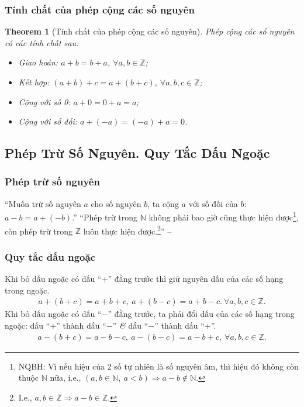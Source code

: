 \documentclass{article}
\numberwithin{equation}{section}
\newtheorem{theorem}{Theorem}[section]
\begin{document}
\subsubsection{Tính chất của phép cộng các số nguyên}

\begin{theorem}[Tính chất của phép cộng các số nguyên]
	Phép cộng các số nguyên có các tính chất sau:
	\begin{itemize}
		\item Giao hoán: $a + b = b + a$, $\forall a,b\in\mathbb{Z}$;
		\item Kết hợp: $(a + b) + c = a + (b + c)$, $\forall a,b,c\in\mathbb{Z}$;
		\item Cộng với số 0: $a + 0 = 0 + a = a$;
		\item Cộng với số đối: $a + (-a) = (-a) + a = 0$.
	\end{itemize}
\end{theorem}

\subsection{Phép Trừ Số Nguyên. Quy Tắc Dấu Ngoặc}

\subsubsection{Phép trừ số nguyên}
``Muốn trừ số nguyên $a$ cho số nguyên $b$, ta cộng $a$ với số đối của $b$: $a - b = a + (-b)$.'' ``Phép trừ trong $\mathbb{N}$ không phải bao giờ cũng thực hiện được\footnote{NQBH: Vì nếu hiệu của 2 số tự nhiên là số nguyên âm, thì hiệu đó không còn thuộc $\mathbb{N}$ nữa, i.e., $(a,b\in\mathbb{N},\ a < b)\Rightarrow a - b\notin\mathbb{N}$.}, còn phép trừ trong $\mathbb{Z}$ luôn thực hiện được.\footnote{I.e., $a,b\in\mathbb{Z}\Rightarrow a - b\in\mathbb{Z}$.}'' -- \cite[p. 76]{Thai_Anh_Dat_Ha_Loan_Nam_Quang_Toan_6_tap_1}

\subsubsection{Quy tắc dấu ngoặc}
Khi bỏ dấu ngoặc có dấu ``$+$'' đằng trước thì giữ nguyên dấu của các số hạng trong ngoặc.
\begin{align*}
	a + (b + c) = a + b + c,\ a + (b - c) = a + b - c.\ \forall a,b,c\in\mathbb{Z}.
\end{align*}
Khi bỏ dấu ngoặc có dấu ``$-$'' đằng trước, ta phải đổi dấu của các số hạng trong ngoặc: dấu ``$+$'' thành dấu ``$-$'' \textit{\&} dấu ``$-$'' thành dấu ``$+$''.
\begin{align*}
	a - (b + c) = a - b - c,\ a - (b - c) = a - b + c,\ \forall a,b,c\in\mathbb{Z}.
\end{align*}
\end{document}
